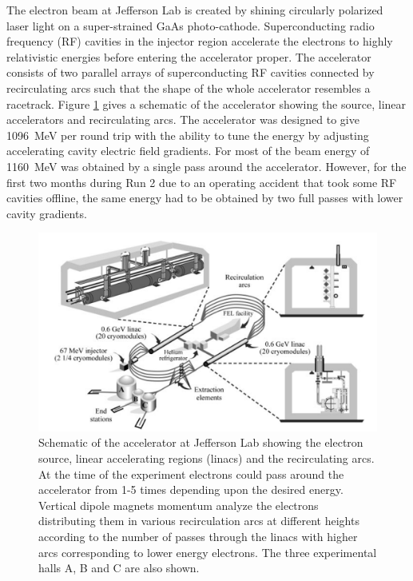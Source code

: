 The electron beam at Jefferson Lab is created by shining circularly polarized laser light on a super-strained GaAs photo-cathode. Superconducting radio frequency (RF) cavities in the injector region accelerate the electrons to highly relativistic energies before entering the accelerator proper\cite{Leeman}. The accelerator consists of two parallel arrays of superconducting RF cavities connected by recirculating arcs such that the shape of the whole accelerator resembles a racetrack. Figure \ref{fig:CEBAF} gives a schematic of the accelerator showing the source, linear accelerators and recirculating arcs. The accelerator was designed to give 1096~MeV per round trip with the ability to tune the energy by adjusting accelerating cavity electric field gradients. For most of \Qs the beam energy of 1160~MeV was obtained by a single pass around the accelerator. However, for the first two months during Run 2 due to an operating accident that took some RF cavities offline, the same energy had to be obtained by two full passes with lower cavity gradients.
\begin{figure}[!t]
\begin{center}
\includegraphics[width=\textwidth]{Pictures/CEBAF.png}
\end{center}
\caption{\label{fig:CEBAF}
Schematic of the accelerator at Jefferson Lab showing the electron source, linear accelerating regions (linacs) and the recirculating arcs. At the time of the \Qs experiment electrons could pass around the accelerator from 1-5 times depending upon the desired energy. Vertical dipole magnets momentum analyze the electrons distributing them in various recirculation arcs at different heights according to the number of passes through the linacs with higher arcs corresponding to lower energy electrons. The three experimental halls A, B and C are also shown.\cite{Leeman}}
\end{figure}

